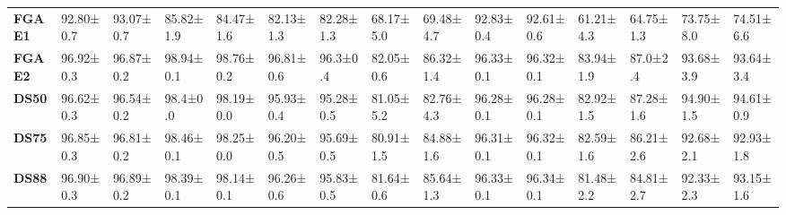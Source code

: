 \documentclass{article}
\begin{document}
\begin{table*}[tb]
\begin{center}
\begin{small}
\begin{sc}
{{\begin{tabular}{lllllllllllllll}
\midrule
\textbf{FGAE1}& 92.80±0.7                       & 93.07±0.7                       & 85.82±1.9                      & 84.47±1.6                       & 82.13±1.3                       & 82.28±1.3                        & 68.17±5.0                      & 69.48±4.7                       & 92.83±0.4                       & 92.61±0.6                       & 61.21±4.3                      & 64.75±1.3                       & 73.75±8.0                      & 74.51±6.6                      \\
\textbf{FGAE2}& 96.92±0.3                      & 96.87±0.2                        & 98.94±0.1                      & 98.76±0.2                       & 96.81±0.6                      & 96.3±0.4                        & 82.05±0.6                      & 86.32±1.4                       & 96.33±0.1                      & 96.32±0.1                       & 83.94±1.9                      & 87.0±2.4                        & 93.68±3.9                      & 93.64±3.4                        \\
\textbf{DS50}& 96.62±0.3                      & 96.54±0.2                       & 98.4±0.0                       & 98.19±0.0                       & 95.93±0.4                      & 95.28±0.5                       & 81.05±5.2                      & 82.76±4.3                        & 96.28±0.1                      & 96.28±0.1                       & 82.92±1.5                      & 87.28±1.6                       & 94.90±1.5                       & 94.61±0.9                       \\
\textbf{DS75}& 96.85±0.3                      & 96.81±0.2                       & 98.46±0.1                      & 98.25±0.0                       & 96.20±0.5                       & 95.69±0.5                       & 80.91±1.5                     & 84.88±1.6                       & 96.31±0.1                      & 96.32±0.1                      & 82.59±1.6                      & 86.21±2.6                       & 92.68±2.1                      & 92.93±1.8                       \\
\textbf{DS88}& 96.90±0.3                       & 96.89±0.2                       & 98.39±0.1                      & 98.14±0.1                       & 96.26±0.6                      & 95.83±0.5                       & 81.64±0.6                      & 85.64±1.3                       & 96.33±0.1                      & 96.34±0.1                       & 81.48±2.2                    & 84.81±2.7                       & 92.33±2.3                      & 93.15±1.6   \\                   

\end{tabular}}}
\end{sc}
\end{small}
\end{center}
\end{table*}
\end{document}
